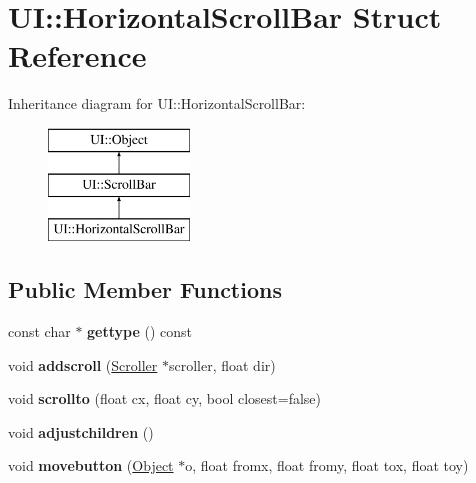 \hypertarget{struct_u_i_1_1_horizontal_scroll_bar}{}\section{UI\+:\+:Horizontal\+Scroll\+Bar Struct Reference}
\label{struct_u_i_1_1_horizontal_scroll_bar}
Inheritance diagram for UI\+:\+:Horizontal\+Scroll\+Bar\+:\begin{figure}[H]
\begin{center}
\leavevmode
\includegraphics[height=3.000000cm]{struct_u_i_1_1_horizontal_scroll_bar}
\end{center}
\end{figure}
\subsection*{Public Member Functions}
\begin{DoxyCompactItemize}
\item 
\mbox{\label{struct_u_i_1_1_horizontal_scroll_bar_a9de677a31bbc314b7c6ee7fd9f80072a}} 
const char $\ast$ {\bfseries gettype} () const
\item 
\mbox{\label{struct_u_i_1_1_horizontal_scroll_bar_a6231ad5e3e4b9ec8d5e277173884fab2}} 
void {\bfseries addscroll} (\hyperlink{struct_u_i_1_1_scroller}{Scroller} $\ast$scroller, float dir)
\item 
\mbox{\label{struct_u_i_1_1_horizontal_scroll_bar_a3ec3496b8af45fa3ba62cf9f7265140b}} 
void {\bfseries scrollto} (float cx, float cy, bool closest=false)
\item 
\mbox{\label{struct_u_i_1_1_horizontal_scroll_bar_a6952cb698f8aee022684fe4411f5dfa5}} 
void {\bfseries adjustchildren} ()
\item 
\mbox{\label{struct_u_i_1_1_horizontal_scroll_bar_a18488ff0a4faf7f36202630c96adc055}} 
void {\bfseries movebutton} (\hyperlink{struct_u_i_1_1_object}{Object} $\ast$o, float fromx, float fromy, float tox, float toy)
\end{DoxyCompactItemize}
